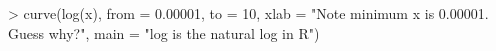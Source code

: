 \begin{Schunk}
\begin{Sinput}
> curve(log(x), from = 0.00001, to = 10, xlab = "Note minimum x is 0.00001. Guess why?", main = "log is the natural log in R")
\end{Sinput}
\end{Schunk}
